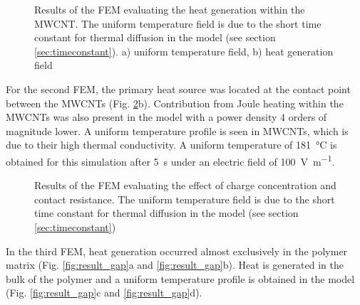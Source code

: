 \begin{figure}[h!]
	\centering
	 \qquad
	\caption{Results of the FEM evaluating the heat generation within the MWCNT. The uniform temperature field is due to the short time constant for thermal diffusion in the model (see section \ref{sec:timeconstant}). a) uniform temperature field, b) heat generation field \cite{Brassard2018_figshare_article1}}
	\label{fig:results_axysymmetric}
\end{figure}

For the second FEM, the primary heat source was located at the contact point between the MWCNTs (Fig. \ref{fig:results_3D}b). 
Contribution from Joule heating within the MWCNTs was also present in the model with a power density 4 orders of magnitude lower. 
A uniform temperature profile is seen in MWCNTs, which is due to their high thermal conductivity. 
A uniform temperature of \SI{181}{\celsius} is obtained for this simulation after \SI{5}{\second} under an electric field of \SI{100}{\volt\per\metre}. 

\begin{figure}[h!]
	\centering
	 \qquad
	\caption{Results of the FEM evaluating the effect of charge concentration and contact resistance. The uniform temperature field is due to the short time constant for thermal diffusion in the model (see section \ref{sec:timeconstant}) \cite{Brassard2018_figshare_article1}}
	\label{fig:results_3D}
\end{figure}
\FloatBarrier

In the third FEM, heat generation occurred almost exclusively in the polymer matrix (Fig. \ref{fig:result_gap}a and \ref{fig:result_gap}b). 
Heat is generated in the bulk of the polymer and a uniform temperature profile is obtained in the model (Fig. \ref{fig:result_gap}c and \ref{fig:result_gap}d). 

